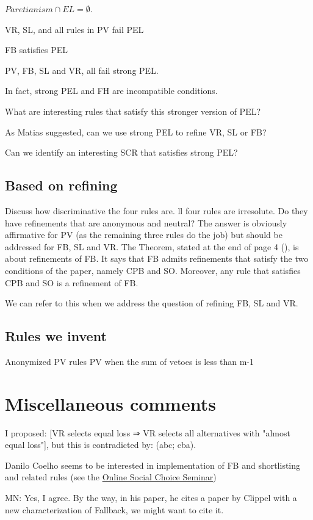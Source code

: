 \documentclass[version=3.21, pagesize, twoside=off, bibliography=totoc, DIV=calc, fontsize=12pt, a4paper]{scrartcl}
\begin{document}
$Paretianism ∩ EL = \emptyset$.



\begin{proposition}
VR, SL, and all rules in PV fail PEL
\end{proposition}
\begin{proposition}
FB satisfies PEL
\end{proposition}


PV, FB, SL and VR, all fail strong PEL. 

In fact, strong PEL and FH are incompatible conditions. 


What are interesting rules that satisfy this stronger version of PEL? 

As Matias suggested, can we use strong PEL to refine VR, SL or FB?

Can we identify an interesting SCR that satisfies strong PEL?

\subsection{Based on refining}
Discuss how discriminative the four rules are. ll four rules are irresolute. Do they have refinements that are anonymous and neutral? The answer is obviously affirmative for PV (as the remaining three rules do the job) but should be addressed for FB, SL and VR. 
The Theorem, stated at the end of page 4 (), is about refinements of FB. It says that FB admits refinements that satisfy the two conditions of the paper, namely CPB and SO. Moreover, any rule that satisfies CPB and SO is a refinement of FB.

We can refer to this when we address the question of refining FB, SL and VR.









\subsection{Rules we invent}
Anonymized PV rules
PV when the sum of vetoes is less than m-1
\section{Miscellaneous comments}
I proposed: [VR selects equal loss ⇒ VR selects all alternatives with "almost equal loss"], but this is contradicted by: (abc; cba).


Danilo Coelho seems to be interested in implementation of FB and shortlisting and related rules (see the \href{https://www.cmss.auckland.ac.nz/2020/06/03/online-social-choice-seminar-series/}{Online Social Choice Seminar})

\color{green}MN: Yes, I agree. By the way, in his paper, he cites a paper by Clippel with a new characterization of Fallback, we might want to cite it.\color{black}

%
\end{document}
